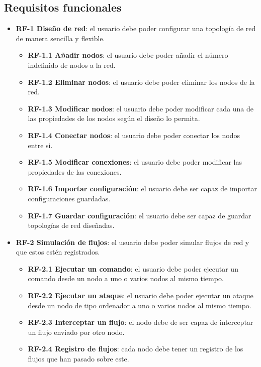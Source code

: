 \subsection{Requisitos funcionales}
\label{subsec:RequisitosFuncionales}
\begin{itemize}
    \item \textbf{RF-1 Diseño de red}: el usuario debe poder configurar una topología de red de manera sencilla y flexible.
    \begin{itemize}
        \item \textbf{RF-1.1 Añadir nodos}: el usuario debe poder añadir el número indefinido de nodos a la red.
        \item \textbf{RF-1.2 Eliminar nodos}: el usuario debe poder eliminar los nodos de la red.
        \item \textbf{RF-1.3 Modificar nodos}: el usuario debe poder modificar cada una de las propiedades de los nodos según el diseño lo permita.
        \item \textbf{RF-1.4 Conectar nodos}: el usuario debe poder conectar los nodos entre si.
        \item \textbf{RF-1.5 Modificar conexiones}: el usuario debe poder modificar las propiedades de las conexiones.
        \item \textbf{RF-1.6 Importar configuración}: el usuario debe ser capaz de importar configuraciones guardadas.
        \item \textbf{RF-1.7 Guardar configuración}: el usuario debe ser capaz de guardar topologías de red diseñadas.
    \end{itemize}
    \item \textbf{RF-2 Simulación de flujos}: el usuario debe poder simular flujos de red y que estos estén registrados.
    \begin{itemize}
        \item \textbf{RF-2.1 Ejecutar un comando}: el usuario debe poder ejecutar un comando desde un nodo a uno o varios nodos al mismo tiempo.
        \item \textbf{RF-2.2 Ejecutar un ataque}: el usuario debe poder ejecutar un ataque desde un nodo de tipo ordenador a uno o varios nodos al mismo tiempo.
        \item \textbf{RF-2.3 Interceptar un flujo}: el nodo debe de ser capaz de interceptar un flujo enviado por otro nodo.
        \item \textbf{RF-2.4 Registro de flujos}: cada nodo debe tener un registro de los flujos que han pasado sobre este.

\end{itemize}
\end{itemize}
